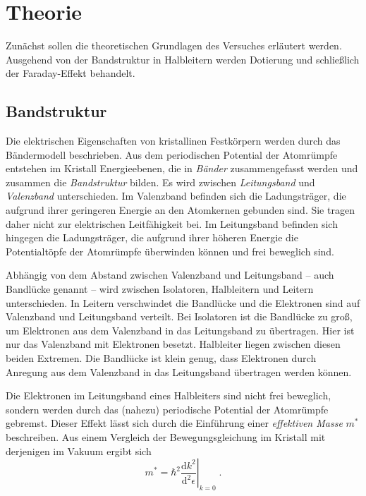 \section{Theorie}
\label{sec:theorie}
Zunächst sollen die theoretischen Grundlagen des Versuches erläutert werden.
Ausgehend von der Bandstruktur in Halbleitern werden Dotierung und schließlich der Faraday-Effekt behandelt.



\subsection{Bandstruktur}
Die elektrischen Eigenschaften von kristallinen Festkörpern werden durch das Bändermodell beschrieben.
Aus dem periodischen Potential der Atomrümpfe entstehen im Kristall Energieebenen,
die in \emph{Bänder} zusammengefasst werden und zusammen die \emph{Bandstruktur} bilden.
Es wird zwischen \emph{Leitungsband} und \emph{Valenzband} unterschieden.
    Im Valenzband befinden sich die Ladungsträger, die aufgrund ihrer geringeren Energie an den Atomkernen gebunden sind.
    Sie tragen daher nicht zur elektrischen Leitfähigkeit bei.
    Im Leitungsband befinden sich hingegen die Ladungsträger,
    die aufgrund ihrer höheren Energie die Potentialtöpfe der Atomrümpfe überwinden können und frei beweglich sind.

Abhängig von dem Abstand zwischen Valenzband und Leitungsband – auch Bandlücke genannt – wird zwischen Isolatoren, Halbleitern und Leitern unterschieden.
    In Leitern verschwindet die Bandlücke und die Elektronen sind auf Valenzband und Leitungsband verteilt.
    Bei Isolatoren ist die Bandlücke zu groß, um Elektronen aus dem Valenzband in das Leitungsband zu übertragen.
    Hier ist nur das Valenzband mit Elektronen besetzt.
    Halbleiter liegen zwischen diesen beiden Extremen.
    Die Bandlücke ist klein genug, dass Elektronen durch Anregung aus dem Valenzband in das Leitungsband übertragen werden können.


Die Elektronen im Leitungsband eines Halbleiters sind nicht frei beweglich,
sondern werden durch das (nahezu) periodische Potential der Atomrümpfe gebremst.
Dieser Effekt lässt sich durch die Einführung einer \emph{effektiven Masse} $m^*$ beschreiben.
Aus einem Vergleich der Bewegungsgleichung im Kristall mit derjenigen im Vakuum ergibt sich
\begin{equation*}
    m^* = \hbar^2 \left. \frac{\mathrm{d} k^2}{\mathrm{d}^2 \epsilon} \right\rvert_{k=0}
    \; .
\end{equation*}


